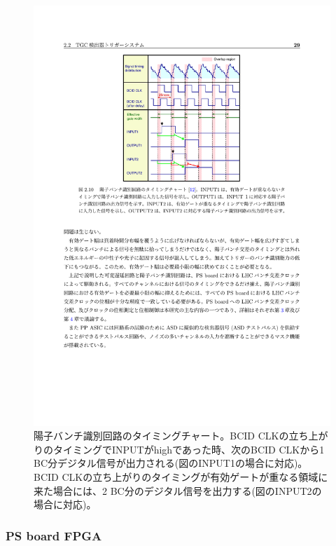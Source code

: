     \begin{figure} 
    \centering
    \includegraphics[width=14cm]{fig/Intro/TGC_BCID.pdf}
    \caption[陽子バンチ識別回路のタイミングチャート]{陽子バンチ識別回路のタイミングチャート\cite{mt_takemoto}。BCID CLKの立ち上がりのタイミングでINPUTがhighであった時、次のBCID CLKから1 BC分デジタル信号が出力される(図のINPUT1の場合に対応)。BCID CLKの立ち上がりのタイミングが有効ゲートが重なる領域に来た場合には、2 BC分のデジタル信号を出力する(図のINPUT2の場合に対応)。}
    \label{TGC_BCID}
    \end{figure}

    \subsubsection*{PS board FPGA}

